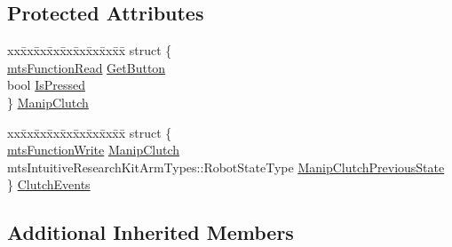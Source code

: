 \subsection*{Protected Attributes}
\begin{DoxyCompactItemize}
\item 
\begin{tabbing}
xx\=xx\=xx\=xx\=xx\=xx\=xx\=xx\=xx\=\kill
struct \{\\
\>\hyperlink{classmts_function_read}{mtsFunctionRead} \hyperlink{classmts_intuitive_research_kit_e_c_m_a544f7f8bbb4ab2a175c35bbb962d6768}{GetButton}\\
\>bool \hyperlink{classmts_intuitive_research_kit_e_c_m_ac3ab65996fefd2e479a066e543696e1c}{IsPressed}\\
\} \hyperlink{classmts_intuitive_research_kit_e_c_m_a48d628c03a4f2997c39aeb7f1413d301}{ManipClutch}\\

\end{tabbing}\item 
\begin{tabbing}
xx\=xx\=xx\=xx\=xx\=xx\=xx\=xx\=xx\=\kill
struct \{\\
\>\hyperlink{classmts_function_write}{mtsFunctionWrite} \hyperlink{classmts_intuitive_research_kit_e_c_m_abb5e805cd25cb99784ddf142e0b671c8}{ManipClutch}\\
\>mtsIntuitiveResearchKitArmTypes::RobotStateType \hyperlink{classmts_intuitive_research_kit_e_c_m_a8e17d129e26e3f66c71c4b128f1e8c44}{ManipClutchPreviousState}\\
\} \hyperlink{classmts_intuitive_research_kit_e_c_m_abe79cef7ca178b040443a41596bdbef7}{ClutchEvents}\\

\end{tabbing}\end{DoxyCompactItemize}
\subsection*{Additional Inherited Members}


